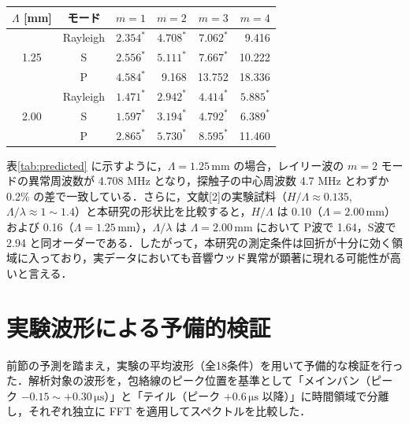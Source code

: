 \documentclass{jarticle}
\makeatletter
\def \tbcaption{\def \@captype{table} \caption}
\makeatother
\begin{document}
\begin{center}
 \tbcaption{式(\ref{eq:grating}) による異常周波数の予測値 [MHz]．
  $\ast$ は探触子の帯域内に入るもの．}
 \vspace{1mm}
 \begin{tabular}{|c|c|r|r|r|r|} \hline
  $\Lambda$ [mm] & モード & $m=1$ & $m=2$ & $m=3$ & $m=4$ \\ \hline\hline
  \multirow{3}{*}{1.25}
   & Rayleigh & $2.354^\ast$ & $4.708^\ast$ & $7.062^\ast$ & 9.416 \\
   & S        & $2.556^\ast$ & $5.111^\ast$ & $7.667^\ast$ & 10.222 \\
   & P        & $4.584^\ast$ & 9.168        & 13.752       & 18.336 \\ \hline
  \multirow{3}{*}{2.00}
   & Rayleigh & $1.471^\ast$ & $2.942^\ast$ & $4.414^\ast$ & $5.885^\ast$ \\
   & S        & $1.597^\ast$ & $3.194^\ast$ & $4.792^\ast$ & $6.389^\ast$ \\
   & P        & $2.865^\ast$ & $5.730^\ast$ & $8.595^\ast$ & 11.460 \\ \hline
 \end{tabular}
 \label{tab:predicted}
\end{center}

\par
表\ref{tab:predicted} に示すように，$\Lambda = 1.25\,\mathrm{mm}$ の場合，レイリー波の $m=2$ モードの異常周波数が 4.708 MHz となり，探触子の中心周波数 4.7 MHz とわずか 0.2\% の差で一致している．さらに，文献[2]の実験試料（$H/\Lambda \approx 0.135$, $\Lambda/\lambda \approx 1\sim1.4$）と本研究の形状比を比較すると，$H/\Lambda$ は 0.10（$\Lambda=2.00\,\mathrm{mm}$）および 0.16（$\Lambda=1.25\,\mathrm{mm}$），$\Lambda/\lambda$ は $\Lambda=2.00\,\mathrm{mm}$ において P波で 1.64，S波で 2.94 と同オーダーである．したがって，本研究の測定条件は回折が十分に効く領域に入っており，実データにおいても音響ウッド異常が顕著に現れる可能性が高いと言える．


\section{実験波形による予備的検証}
\par
前節の予測を踏まえ，実験の平均波形（全18条件）を用いて予備的な検証を行った．解析対象の波形を，包絡線のピーク位置を基準として「メインバン（ピーク $-0.15 \sim +0.30\,\mathrm{\mu s}$）」と「テイル（ピーク $+0.6\,\mathrm{\mu s}$ 以降）」に時間領域で分離し，それぞれ独立に FFT を適用してスペクトルを比較した．
\end{document}
